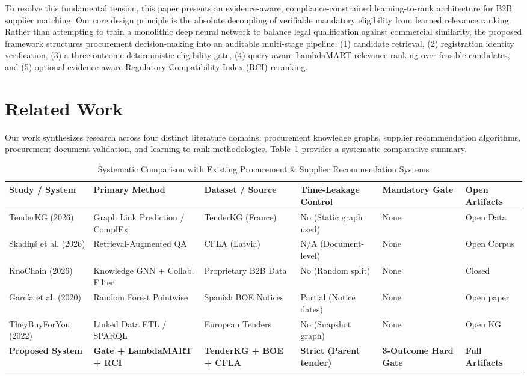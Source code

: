 \documentclass[journal,10pt,onecolumn,draftclsnofoot]{IEEEtran}
\begin{document}
To resolve this fundamental tension, this paper presents an evidence-aware, compliance-constrained learning-to-rank architecture for B2B supplier matching. Our core design principle is the absolute decoupling of verifiable mandatory eligibility from learned relevance ranking. Rather than attempting to train a monolithic deep neural network to balance legal qualification against commercial similarity, the proposed framework structures procurement decision-making into an auditable multi-stage pipeline: (1) candidate retrieval, (2) registration identity verification, (3) a three-outcome deterministic eligibility gate, (4) query-aware LambdaMART relevance ranking over feasible candidates, and (5) optional evidence-aware Regulatory Compatibility Index (RCI) reranking.

\section{Related Work}
Our work synthesizes research across four distinct literature domains: procurement knowledge graphs, supplier recommendation algorithms, procurement document validation, and learning-to-rank methodologies. Table~\ref{tab:literature} provides a systematic comparative summary.

\begin{table}[t]
\centering
\caption{Systematic Comparison with Existing Procurement \& Supplier Recommendation Systems}
\label{tab:literature}
\begin{tabular}{llllll}
\toprule
Study / System & Primary Method & Dataset / Source & Time-Leakage Control & Mandatory Gate & Open Artifacts \\
\midrule
TenderKG (2026) \cite{mokhtari2026tenderkg} & Graph Link Prediction / ComplEx & TenderKG (France) & No (Static graph used) & None & Open Data \\
Skadi\c{n}\v{s} et al. (2026) \cite{skadins2026dataset} & Retrieval-Augmented QA & CFLA (Latvia) & N/A (Document-level) & None & Open Corpus \\
KnoChain (2026) \cite{li2026knochain} & Knowledge GNN + Collab. Filter & Proprietary B2B Data & No (Random split) & None & Closed \\
Garc\'ia et al. (2020) \cite{garcia2020bidders} & Random Forest Pointwise & Spanish BOE Notices & Partial (Notice dates) & None & Open paper \\
TheyBuyForYou (2022) \cite{soylu2022theybuyforyou} & Linked Data ETL / SPARQL & European Tenders & No (Snapshot graph) & None & Open KG \\
\textbf{Proposed System} & \textbf{Gate + LambdaMART + RCI} & \textbf{TenderKG + BOE + CFLA} & \textbf{Strict (Parent tender)} & \textbf{3-Outcome Hard Gate} & \textbf{Full Artifacts} \\
\bottomrule
\end{tabular}
\end{table}
\end{document}
